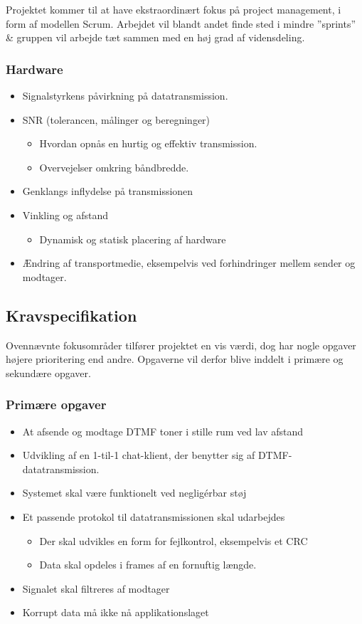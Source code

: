 Projektet kommer til at have ekstraordinært fokus på project management, i form af modellen Scrum. Arbejdet vil blandt andet finde sted i mindre ”sprints” \& gruppen vil arbejde tæt sammen med en høj grad af vidensdeling.

\subsubsection{Hardware}

\begin{itemize}
  \item Signalstyrkens påvirkning på datatransmission.
  \item SNR (tolerancen, målinger og beregninger)
  \begin{itemize}
  \item Hvordan opnås en hurtig og effektiv transmission.
  \item Overvejelser omkring båndbredde.
  \end{itemize}
  \item Genklangs inflydelse på transmissionen
  \item Vinkling og afstand
  \begin{itemize}
  \item Dynamisk og statisk placering af hardware
  \end{itemize}
  \item Ændring af transportmedie, eksempelvis ved forhindringer mellem sender og modtager.
\end{itemize}

\subsection{Kravspecifikation}

Ovennævnte fokusområder tilfører projektet en vis værdi, dog har nogle opgaver højere prioritering end andre. Opgaverne vil derfor blive inddelt i primære og sekundære opgaver.

\subsubsection{Primære opgaver}

\begin{itemize}
  \item At afsende og modtage DTMF toner i stille rum ved lav afstand
  \item Udvikling af en 1-til-1 chat-klient, der benytter sig af DTMF-datatransmission.
  \item Systemet skal være funktionelt ved negligérbar støj
  \item Et passende protokol til datatransmissionen skal udarbejdes
  \begin{itemize}
    \item Der skal udvikles en form for fejlkontrol, eksempelvis et CRC
    \item Data skal opdeles i frames af en fornuftig længde.
  \end{itemize}
  \item Signalet skal filtreres af modtager
  \item Korrupt data må ikke nå applikationslaget
\end{itemize}

